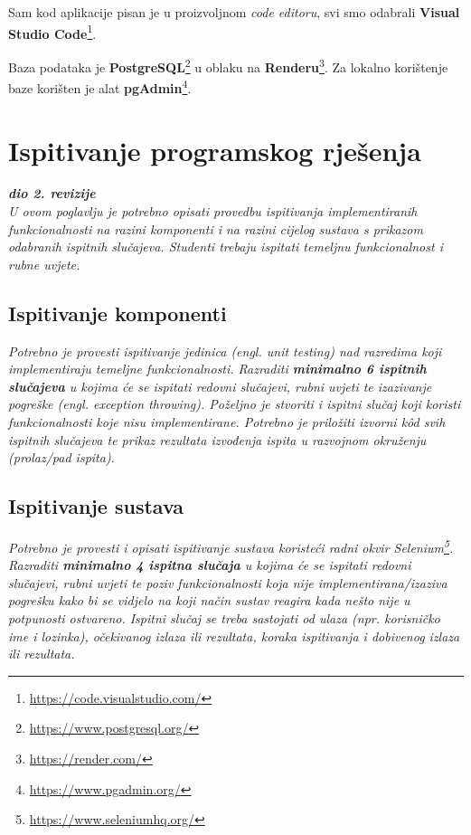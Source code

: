 			Sam kod aplikacije pisan je u proizvoljnom \textit{code editoru}, svi smo odabrali \textbf{Visual Studio Code}\footnote{\url{https://code.visualstudio.com/}}.
			
			Baza podataka je \textbf{PostgreSQL}\footnote{\url{https://www.postgresql.org/}} u oblaku na \textbf{Renderu}\footnote{\url{https://render.com/}}. Za lokalno korištenje baze korišten je alat \textbf{pgAdmin}\footnote{\url{https://www.pgadmin.org/}}. 
			
			\eject 
		
	
		\section{Ispitivanje programskog rješenja}
			
			\textbf{\textit{dio 2. revizije}}\\
			
			 \textit{U ovom poglavlju je potrebno opisati provedbu ispitivanja implementiranih funkcionalnosti na razini komponenti i na razini cijelog sustava s prikazom odabranih ispitnih slučajeva. Studenti trebaju ispitati temeljnu funkcionalnost i rubne uvjete.}
	
			
			\subsection{Ispitivanje komponenti}
			\textit{Potrebno je provesti ispitivanje jedinica (engl. unit testing) nad razredima koji implementiraju temeljne funkcionalnosti. Razraditi \textbf{minimalno 6 ispitnih slučajeva} u kojima će se ispitati redovni slučajevi, rubni uvjeti te izazivanje pogreške (engl. exception throwing). Poželjno je stvoriti i ispitni slučaj koji koristi funkcionalnosti koje nisu implementirane. Potrebno je priložiti izvorni kôd svih ispitnih slučajeva te prikaz rezultata izvođenja ispita u razvojnom okruženju (prolaz/pad ispita). }
			
			
			
			\subsection{Ispitivanje sustava}
			
			 \textit{Potrebno je provesti i opisati ispitivanje sustava koristeći radni okvir Selenium\footnote{\url{https://www.seleniumhq.org/}}. Razraditi \textbf{minimalno 4 ispitna slučaja} u kojima će se ispitati redovni slučajevi, rubni uvjeti te poziv funkcionalnosti koja nije implementirana/izaziva pogrešku kako bi se vidjelo na koji način sustav reagira kada nešto nije u potpunosti ostvareno. Ispitni slučaj se treba sastojati od ulaza (npr. korisničko ime i lozinka), očekivanog izlaza ili rezultata, koraka ispitivanja i dobivenog izlaza ili rezultata.\\ }
			 
